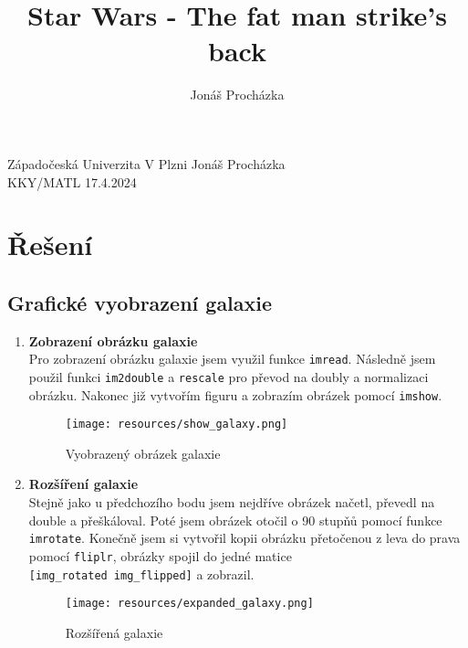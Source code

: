 \documentclass[12pt]{article}
\title{Star Wars - The fat man strike's back}
\author{Jonáš Procházka}
\date{}
\begin{document}
\maketitle
\vfill{}
\noindent
Západočeská Univerzita V Plzni \hfill Jonáš Procházka\\
KKY/MATL \hfill 17.4.2024

\thispagestyle{empty}
\newpage
\setcounter{page}{1}

\section{Řešení}

\subsection{Grafické vyobrazení galaxie}
\begin{enumerate}[label=(\alph*)]
  \item \textbf{Zobrazení obrázku galaxie} \\
        Pro zobrazení obrázku galaxie jsem využil funkce \verb|imread|. Následně jsem použil funkci \verb|im2double| a \verb|rescale| pro převod na doubly a normalizaci obrázku. Nakonec již vytvořím figuru a zobrazím obrázek pomocí \verb|imshow|. \\
        \begin{figure}[h]
          \centering
          \texttt{[image: resources/show\_galaxy.png]}
          \caption{Vyobrazený obrázek galaxie}
        \end{figure}
  \item \textbf{Rozšíření galaxie} \\
        Stejně jako u předchozího bodu jsem nejdříve obrázek načetl, převedl na double a přeškáloval. Poté jsem obrázek otočil o 90 stupňů pomocí funkce \verb|imrotate|. Konečně jsem si vytvořil kopii obrázku přetočenou z leva do prava pomocí \verb|fliplr|, obrázky spojil do jedné matice \\ \verb|[img_rotated img_flipped]| a zobrazil. \\
        \begin{figure}[h]
          \centering
          \texttt{[image: resources/expanded\_galaxy.png]}
          \caption{Rozšířená galaxie}
        \end{figure}
\end{enumerate}
\end{document}
